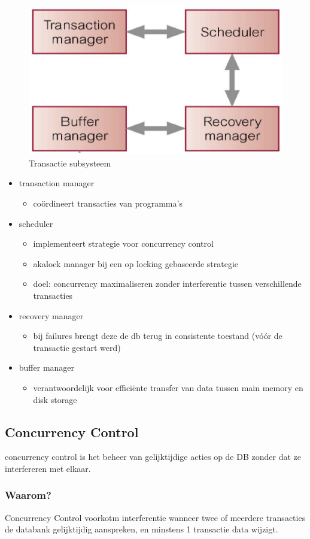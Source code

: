 \documentclass[a4paper,12pt]{article}
\begin{document}
\begin{figure}[H]
\centering
  	\includegraphics[width=.35\linewidth]{img/transactionSubsysteem.png}
  	\caption{Transactie subsysteem}
  	\label{fig:TransactieSubsysteem}
\end{figure}

\begin{itemize}
\item transaction manager
	\begin{itemize}
	\item coördineert transacties van programma's
	\end{itemize}
\item scheduler
	\begin{itemize}
	\item implementeert strategie voor concurrency control
	\item akalock manager bij een op locking gebaseerde strategie
	\item doel: concurrency maximaliseren zonder interferentie tussen verschillende transacties
	\end{itemize}
\item recovery manager
	\begin{itemize}
	\item bij failures brengt deze de db terug in consistente toestand (vóór de transactie gestart werd)	
	\end{itemize}
\item buffer manager
	\begin{itemize}
	\item verantwoordelijk voor efficiënte transfer van data tussen main memory en disk storage
	\end{itemize}
\end{itemize}

\subsection{Concurrency Control}
concurrency control is het beheer van gelijktijdige acties op de DB zonder dat ze interfereren met elkaar.

\subsubsection{Waarom?}
Concurrency Control voorkotm interferentie wanneer twee of meerdere transacties de databank gelijktijdig aanspreken, en minstens 1 transactie data wijzigt.
\end{document}
